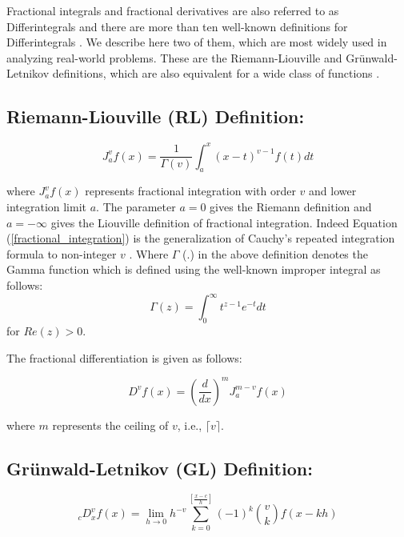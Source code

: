 \documentclass {llncs}
\begin{document}
\noindent Fractional integrals and fractional derivatives are also referred to as  Differintegrals \cite{B1_74} and  there are more than ten
well-known definitions for Differintegrals \cite{APP_10}. We describe here two of them,  which are  most widely used in analyzing real-world problems. These are the Riemann-Liouville and Gr\"{u}nwald-Letnikov definitions, which are also equivalent for a wide class of functions \cite{c_2}.


 \subsection*{\textbf{Riemann-Liouville (RL) Definition:}}



\begin{equation}\label{fractional_integration}
J^{v}_{a}f(x) = \frac{1}{\Gamma (v)}\int_{a}^{x} (x-t)^{v-1}f(t)dt
\end{equation}

\noindent where $J^{v}_{a}f(x)$ represents  fractional integration with order  $v$ and  lower integration limit $a$. The parameter $a = 0$ gives the Riemann definition and
 $a = -\infty$ gives the Liouville definition of fractional integration. Indeed Equation (\ref{fractional_integration})
 is the generalization  of Cauchy's repeated integration formula to non-integer $v$ \cite{BROSS_75}.
 Where  $\Gamma$ (.) in the above definition denotes the Gamma function which is defined using the well-known improper integral as follows:
\begin{equation}\label{gamma_improper}
\Gamma(z)= \int_{0}^{\infty} t^{z-1}e^{-t}dt
\end{equation}
\noindent for $Re(z) > 0$.


The fractional differentiation is given as follows:


  \begin{equation}\label{fractional_diff}
D^{v}f(x) = (\frac{d}{dx})^{m} J^{m-v}_{a}f(x)
     \end{equation}



\noindent where $m$ represents the ceiling of $v$, i.e., $\lceil v \rceil$.


 \subsection*{\textbf{Gr\"{u}nwald-Letnikov (GL) Definition:}}


\begin{equation}
_{c}D_{x}^{v}f(x)= \lim_{h\rightarrow0}h^{-v}\sum_{k=0}^{[\frac{x-c}{h}]}(-1)^{k}{v\choose k} f(x - kh)
\end{equation}
\end{document}
